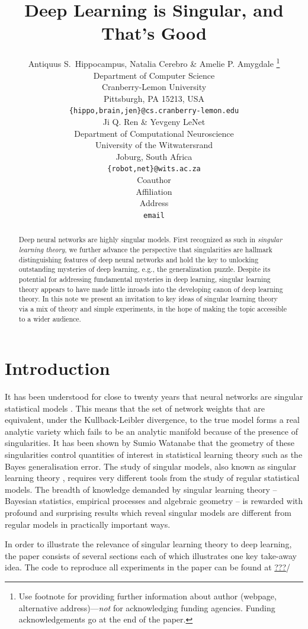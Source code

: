 \documentclass{article} %
\title{Deep Learning is Singular, and That's Good}
\author{Antiquus S.~Hippocampus, Natalia Cerebro \& Amelie P. Amygdale \thanks{ Use footnote for providing further information
about author (webpage, alternative address)---\emph{not} for acknowledging
funding agencies.  Funding acknowledgements go at the end of the paper.} \\
Department of Computer Science\\
Cranberry-Lemon University\\
Pittsburgh, PA 15213, USA \\
\texttt{\{hippo,brain,jen\}@cs.cranberry-lemon.edu} \\
\And
Ji Q. Ren \& Yevgeny LeNet \\
Department of Computational Neuroscience \\
University of the Witwatersrand \\
Joburg, South Africa \\
\texttt{\{robot,net\}@wits.ac.za} \\
\AND
Coauthor \\
Affiliation \\
Address \\
\texttt{email}
}
\begin{document}
\maketitle

\begin{abstract}
Deep neural networks are highly singular models. First recognized as such in \textit{singular learning theory}, we further advance the perspective that singularities are hallmark distinguishing features of deep neural networks and hold the key to unlocking outstanding mysteries of deep learning, e.g., the generalization puzzle.
Despite its potential for addressing fundamental mysteries in deep learning, singular learning theory appears to have made little inroads into the developing canon of deep learning theory. In this note we present an invitation to key ideas of singular learning theory via a mix of theory and simple experiments, in the hope of making the topic accessible to a wider audience. 
\end{abstract}

\section{Introduction}

It has been understood for close to twenty years that neural networks are singular statistical models \cite{amari_learning_2003, watanabe_almost_2007}. This means that the set of network weights that are equivalent, under the Kullback-Leibler divergence, to the true model forms a real analytic variety which fails to be an analytic manifold because of the presence of singularities. It has been shown by Sumio Watanabe that the geometry of these singularities control quantities of interest in statistical learning theory such as the Bayes generalisation error. The study of singular models, also known as singular learning theory \citep{watanabe_algebraic_2009}, requires very different tools from the study of regular statistical models. The breadth of knowledge demanded by singular learning theory -- Bayesian statistics, empirical processes and algebraic geometry -- is rewarded with profound and surprising results which reveal singular models are different from regular models in practically important ways.

In order to illustrate the relevance of singular learning theory to deep learning, the paper consists of several sections each of which illustrates one key take-away idea. The code to reproduce all experiments in the paper can be found at \url{???}/
\end{document}
